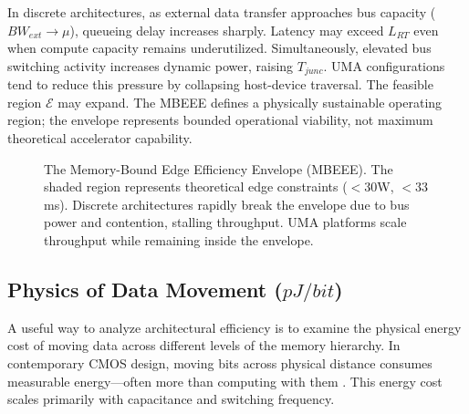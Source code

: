 \documentclass[conference]{IEEEtran}
\begin{document}
In discrete architectures, as external data transfer approaches bus capacity ($BW_{ext} \to \mu$), queueing delay increases sharply. Latency may exceed $L_{RT}$ even when compute capacity remains underutilized. Simultaneously, elevated bus switching activity increases dynamic power, raising $T_{junc}$. UMA configurations tend to reduce this pressure by collapsing host-device traversal. The feasible region $\mathcal{E}$ may expand. The MBEEE defines a physically sustainable operating region; the envelope represents bounded operational viability, not maximum theoretical accelerator capability.

\begin{figure}[htbp]
\centering
{}
\caption{The Memory-Bound Edge Efficiency Envelope (MBEEE). The shaded region represents theoretical edge constraints ($<30$W, $<33$ms). Discrete architectures rapidly break the envelope due to bus power and contention, stalling throughput. UMA platforms scale throughput while remaining inside the envelope.}
\label{fig:mbeee}
\end{figure}

\subsection{Physics of Data Movement ($pJ/bit$)}
A useful way to analyze architectural efficiency is to examine the physical energy cost of moving data across different levels of the memory hierarchy. In contemporary CMOS design, moving bits across physical distance consumes measurable energy—often more than computing with them \cite{b8}. This energy cost scales primarily with capacitance and switching frequency.
\end{document}
